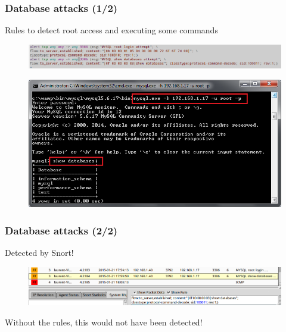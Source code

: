 \documentclass{beamer}
\begin{document}
\begin{frame}
\frametitle{Database attacks (1/2)}
Rules to detect root access and executing some commands
\begin{figure}
   \includegraphics[width= 1\linewidth]{../images/VM_MSSQL_5.png}
\end{figure}
\begin{figure}
   \includegraphics[width= 0.7\linewidth]{../images/VM_MSSQL_4.png}
\end{figure}
\end{frame}
\begin{frame}
\frametitle{Database attacks (2/2)}
Detected by Snort!
\begin{figure}
   \includegraphics[width= 1\linewidth]{../images/VM_MSSQL_6.png}
\end{figure}
Without the rules, this would not have been detected!
\end{frame}


\end{document}
